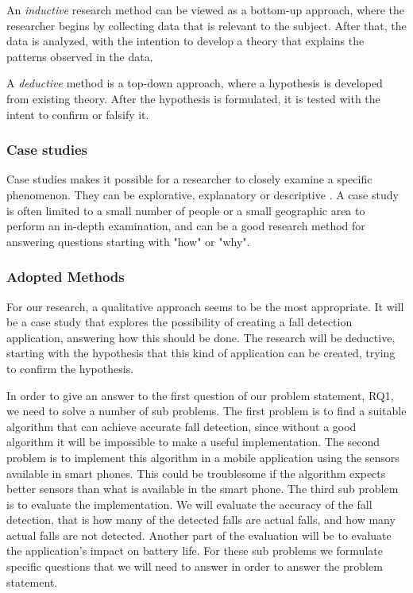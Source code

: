 \documentclass[12pt, a4paper, onecolumn]{article}
\begin{document}
	An \textit{inductive} research method can be viewed as a bottom-up approach, where the researcher begins by collecting data that is relevant to the subject. After that, the data is analyzed, with the intention to develop a theory that explains the patterns observed in the data.
	
	A \textit{deductive} method is a top-down approach, where a hypothesis is developed from existing theory. After the hypothesis is formulated, it is tested with the intent to confirm or falsify it.
	
	\subsubsection{Case studies}
	
	Case studies makes it possible for a researcher to closely examine a specific phenomenon. They can be explorative, explanatory or descriptive \cite[p~4]{yin}. A case study is often limited to a small number of people or a small geographic area to perform an in-depth examination, and can be a good research method for answering questions starting with "how" or "why".
	
	\subsubsection{Adopted Methods}
	
	For our research, a qualitative approach seems to be the most appropriate. It will be a case study that explores the possibility of creating a fall detection application, answering how this should be done. The research will be deductive, starting with the hypothesis that this kind of application can be created, trying to confirm the hypothesis. 
	
	In order to give an answer to the first question of our problem statement, RQ1, we need to solve a number of sub problems. The first problem is to find a suitable algorithm that can achieve accurate fall detection, since without a good algorithm it will be impossible to make a useful implementation. The second problem is to implement this algorithm in a mobile application using the sensors available in smart phones. This could be troublesome if the algorithm expects better sensors than what is available in the smart phone. The third sub problem is to evaluate the implementation. We will evaluate the accuracy of the fall detection, that is how many of the detected falls are actual falls, and how many actual falls are not detected. Another part of the evaluation will be to evaluate the application's impact on battery life. For these sub problems we formulate specific questions that we will need to answer in order to answer the problem statement.
	
\end{document}
